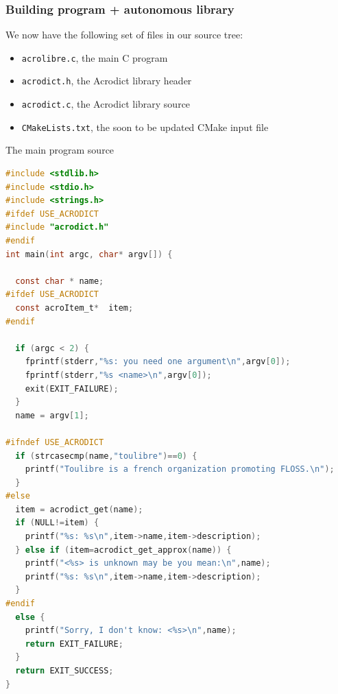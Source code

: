 \documentclass[compress,slidestop,table
              ]
               {beamer}
\newcommand{\fname}[1]{\texttt{#1}}
\begin{document}
\begin{frame}[fragile]
\frametitle{Building program + autonomous library}
We now have the following set of files in our source tree:
\begin{itemize}
\item \fname{acrolibre.c}, the main C program
\item \fname{acrodict.h}, the Acrodict library header
\item \fname{acrodict.c}, the Acrodict library source
\item \fname{CMakeLists.txt}, the soon to be updated CMake input file
\end{itemize}
\end{frame}

\begin{frame}[fragile]
\setlength{\columnsep}{0.8cm}
\vspace*{-0.5cm}
\begin{center}
The main program source
\end{center}
\begin{multicols}{2}
\begin{lstlisting}[basicstyle=\tiny,language=C,breaklines=true]
#include <stdlib.h>
#include <stdio.h>
#include <strings.h>
#ifdef USE_ACRODICT
#include "acrodict.h"
#endif
int main(int argc, char* argv[]) {

  const char * name;
#ifdef USE_ACRODICT
  const acroItem_t*  item;
#endif

  if (argc < 2) {
    fprintf(stderr,"%s: you need one argument\n",argv[0]);
    fprintf(stderr,"%s <name>\n",argv[0]);
    exit(EXIT_FAILURE);
  }
  name = argv[1];

#ifndef USE_ACRODICT
  if (strcasecmp(name,"toulibre")==0) {
    printf("Toulibre is a french organization promoting FLOSS.\n");
  }
#else
  item = acrodict_get(name);
  if (NULL!=item) {
    printf("%s: %s\n",item->name,item->description);
  } else if (item=acrodict_get_approx(name)) {
    printf("<%s> is unknown may be you mean:\n",name);
    printf("%s: %s\n",item->name,item->description);
  }
#endif
  else {
    printf("Sorry, I don't know: <%s>\n",name);
    return EXIT_FAILURE;
  }
  return EXIT_SUCCESS;
}
\end{lstlisting}
\end{multicols}
\end{frame}
\end{document}
